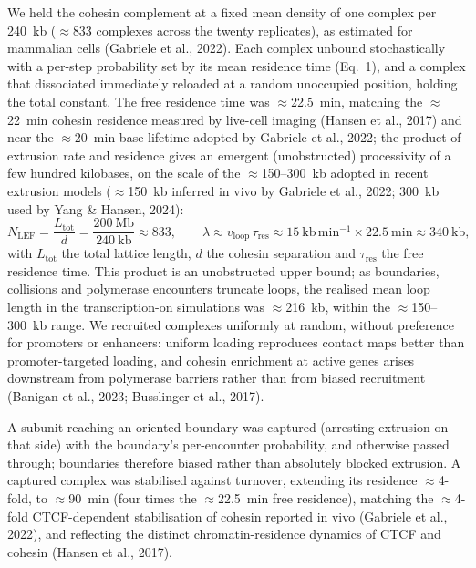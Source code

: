 \documentclass[11pt]{article}
\begin{document}
We held the cohesin complement at a fixed mean density of one complex per 240~kb
($\approx$833 complexes across the twenty replicates), as estimated for mammalian
cells (Gabriele et al., 2022). Each complex unbound stochastically with a per-step
probability set by its mean residence time (Eq.~1), and a complex that dissociated
immediately reloaded at a random unoccupied position, holding the total constant.
The free residence time was $\approx$22.5~min, matching the $\approx$22~min cohesin
residence measured by live-cell imaging (Hansen et al., 2017) and near the $\approx$20~min
base lifetime adopted by Gabriele et al., 2022; the product of extrusion rate
and residence gives an emergent (unobstructed) processivity of a few hundred kilobases,
on the scale of the
$\approx$150--300~kb adopted in recent extrusion models ($\approx$150~kb inferred in vivo
by Gabriele et al., 2022; 300~kb used by Yang \& Hansen, 2024):
%
\begin{equation}
N_{\mathrm{LEF}} = \frac{L_{\mathrm{tot}}}{d}
= \frac{200\ \mathrm{Mb}}{240\ \mathrm{kb}} \approx 833,
\qquad
\lambda \approx v_{\mathrm{loop}}\,\tau_{\mathrm{res}}
\approx 15\ \mathrm{kb\,min^{-1}} \times 22.5\ \mathrm{min} \approx 340\ \mathrm{kb},
\end{equation}
%
with $L_{\mathrm{tot}}$ the total lattice length, $d$ the cohesin separation and
$\tau_{\mathrm{res}}$ the free residence time. This product is an unobstructed upper
bound; as boundaries, collisions and polymerase encounters truncate loops, the realised
mean loop length in the transcription-on simulations was $\approx$216~kb, within the
$\approx$150--300~kb range. We recruited complexes uniformly at
random, without preference for promoters or enhancers: uniform loading reproduces
contact maps better than promoter-targeted loading, and cohesin enrichment at
active genes arises downstream from polymerase barriers rather than from biased
recruitment (Banigan et al., 2023; Busslinger et al., 2017).

A subunit reaching an oriented boundary was captured (arresting extrusion on
that side) with the boundary's per-encounter probability, and otherwise passed
through; boundaries therefore biased rather than absolutely blocked extrusion. A
captured complex was stabilised against turnover, extending its residence
$\approx$4-fold, to $\approx$90~min (four times the $\approx$22.5~min free residence), matching the $\approx$4-fold CTCF-dependent
stabilisation of cohesin reported in vivo (Gabriele et al., 2022), and reflecting the distinct chromatin-residence dynamics of CTCF and cohesin (Hansen et al., 2017).
\end{document}
